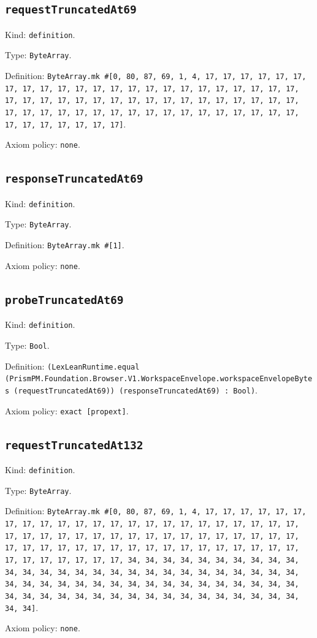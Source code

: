 \documentclass[11pt]{article}
\begin{document}
\subsection*{\texttt{requestTruncatedAt69}}
\noindent Kind: \texttt{definition}.\par
\noindent Type: \texttt{ByteArray}.\par
\noindent Definition: \texttt{ByteArray.mk \#[0, 80, 87, 69, 1, 4, 17, 17, 17, 17, 17, 17, 17, 17, 17, 17, 17, 17, 17, 17, 17, 17, 17, 17, 17, 17, 17, 17, 17, 17, 17, 17, 17, 17, 17, 17, 17, 17, 17, 17, 17, 17, 17, 17, 17, 17, 17, 17, 17, 17, 17, 17, 17, 17, 17, 17, 17, 17, 17, 17, 17, 17, 17, 17, 17, 17, 17, 17, 17, 17]}.\par
\noindent Axiom policy: \texttt{none}.\par
\subsection*{\texttt{responseTruncatedAt69}}
\noindent Kind: \texttt{definition}.\par
\noindent Type: \texttt{ByteArray}.\par
\noindent Definition: \texttt{ByteArray.mk \#[1]}.\par
\noindent Axiom policy: \texttt{none}.\par
\subsection*{\texttt{probeTruncatedAt69}}
\noindent Kind: \texttt{definition}.\par
\noindent Type: \texttt{Bool}.\par
\noindent Definition: \texttt{(LexLeanRuntime.equal (PrismPM.Foundation.Browser.V1.WorkspaceEnvelope.workspaceEnvelopeBytes (requestTruncatedAt69)) (responseTruncatedAt69) : Bool)}.\par
\noindent Axiom policy: \texttt{exact [propext]}.\par
\subsection*{\texttt{requestTruncatedAt132}}
\noindent Kind: \texttt{definition}.\par
\noindent Type: \texttt{ByteArray}.\par
\noindent Definition: \texttt{ByteArray.mk \#[0, 80, 87, 69, 1, 4, 17, 17, 17, 17, 17, 17, 17, 17, 17, 17, 17, 17, 17, 17, 17, 17, 17, 17, 17, 17, 17, 17, 17, 17, 17, 17, 17, 17, 17, 17, 17, 17, 17, 17, 17, 17, 17, 17, 17, 17, 17, 17, 17, 17, 17, 17, 17, 17, 17, 17, 17, 17, 17, 17, 17, 17, 17, 17, 17, 17, 17, 17, 17, 17, 34, 34, 34, 34, 34, 34, 34, 34, 34, 34, 34, 34, 34, 34, 34, 34, 34, 34, 34, 34, 34, 34, 34, 34, 34, 34, 34, 34, 34, 34, 34, 34, 34, 34, 34, 34, 34, 34, 34, 34, 34, 34, 34, 34, 34, 34, 34, 34, 34, 34, 34, 34, 34, 34, 34, 34, 34, 34, 34, 34, 34, 34, 34]}.\par
\noindent Axiom policy: \texttt{none}.\par
\end{document}
